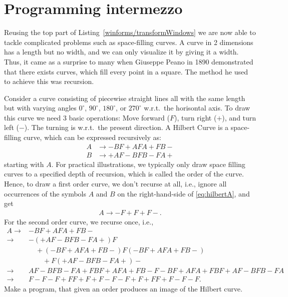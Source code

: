 \section{Programming intermezzo}
Reusing the top part of Listing~\ref{winforms/transformWindows} we are now able to tackle complicated problems such as space-filling curves. A curve in 2 dimensions has a length but no width, and we can only visualize it by giving it a width. Thus, it came as a surprise to many when Giuseppe Peano in 1890 demonstrated that there exists curves, which fill every point in a square. The method he used to achieve this was recursion.
\begin{problem}
  Consider a curve consisting of piecewise straight lines all with the same length but with varying angles $0^{\circ}$, $90^{\circ}$, $180^{\circ}$, or $270^{\circ}$ w.r.t.\ the horisontal axis. To draw this curve we need 3 basic operations: Move forward ($F$), turn right ($+$), and turn left ($-$). The turning is w.r.t.\ the present direction. A Hilbert Curve is a space-filling curve, which can be expressed recursively as:
\begin{align}
  A &\rightarrow -BF+AFA+FB-\label{eq:hilbertA}\\
  B &\rightarrow +AF-BFB-FA+\label{eq:hilbertB}
\end{align}
starting with $A$. For practical illustrations, we typically only draw space filling curves to a specified depth of recursion, which is called the order of the curve. Hence, to draw a first order curve, we don't recurse at all, i.e., ignore all occurrences of the symbols $A$ and $B$ on the right-hand-side of \eqref{eq:hilbertA}, and get 
\begin{align*}
  A \rightarrow -F+F+F-. 
\end{align*}
For the second order curve, we recurse once, i.e., 
\begin{align*}
  A 
  \rightarrow &-BF+AFA+FB- \\
  \rightarrow &-(+AF-BFB-FA+)F\\
               &\quad+(-BF+AFA+FB-)F(-BF+AFA+FB-)\\
               &\qquad +F(+AF-BFB-FA+)-\\
  \rightarrow &AF-BFB-FA+FBF+AFA+FB-F-BF+AFA+FBF+AF-BFB-FA\\
  \rightarrow &F-F-F+FF+F+F-F-F+F+FF+F-F-F.
\end{align*}
Make a program, that given an order produces an image of the Hilbert curve.
\end{problem}

